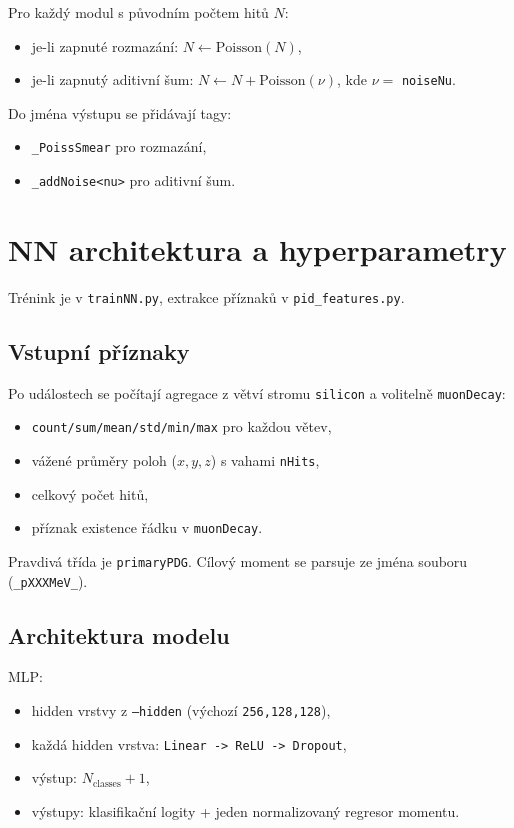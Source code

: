 \documentclass[11pt,a4paper]{article}
\begin{document}
Pro každý modul s původním počtem hitů \(N\):
\begin{itemize}
  \item je-li zapnuté rozmazání: \(N \leftarrow \mathrm{Poisson}(N)\),
  \item je-li zapnutý aditivní šum: \(N \leftarrow N + \mathrm{Poisson}(\nu)\), kde \(\nu=\) \texttt{noiseNu}.
\end{itemize}

Do jména výstupu se přidávají tagy:
\begin{itemize}
  \item \texttt{\_PoissSmear} pro rozmazání,
  \item \texttt{\_addNoise<nu>} pro aditivní šum.
\end{itemize}

\section{NN architektura a hyperparametry}
Trénink je v \texttt{trainNN.py}, extrakce příznaků v \texttt{pid\_features.py}.

\subsection{Vstupní příznaky}
Po událostech se počítají agregace z větví stromu \texttt{silicon} a volitelně \texttt{muonDecay}:
\begin{itemize}
  \item \texttt{count/sum/mean/std/min/max} pro každou větev,
  \item vážené průměry poloh (\(x,y,z\)) s vahami \texttt{nHits},
  \item celkový počet hitů,
  \item příznak existence řádku v \texttt{muonDecay}.
\end{itemize}
Pravdivá třída je \texttt{primaryPDG}. Cílový moment se parsuje ze jména souboru (\texttt{\_pXXXMeV\_}).

\subsection{Architektura modelu}
MLP:
\begin{itemize}
  \item hidden vrstvy z \texttt{--hidden} (výchozí \texttt{256,128,128}),
  \item každá hidden vrstva: \texttt{Linear -> ReLU -> Dropout},
  \item výstup: \(N_{\text{classes}}+1\),
  \item výstupy: klasifikační logity + jeden normalizovaný regresor momentu.
\end{itemize}
\end{document}

